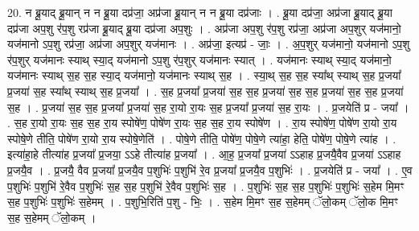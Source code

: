 \documentclass[17pt]{extarticle}
\begin{document}
20. न ब्रू॒याद् ब्रू॒यान् न न ब्रू॒या दप्र॑जा॒ अप्र॑जा ब्रू॒यान् न न ब्रू॒या दप्र॑जाः । . ब्रू॒या दप्र॑जा॒ अप्र॑जा ब्रू॒याद् ब्रू॒या दप्र॑जा अप॒शु र॑प॒शु रप्र॑जा ब्रू॒याद् ब्रू॒या दप्र॑जा अप॒शुः । . अप्र॑जा अप॒शु र॑प॒शु रप्र॑जा॒ अप्र॑जा अप॒शुर् यज॑मानो॒ यज॑मानो ऽप॒शु रप्र॑जा॒ अप्र॑जा अप॒शुर् यज॑मानः । . अप्र॑जा॒ इत्यप्र॑ - जाः॒ । . अ॒प॒शुर् यज॑मानो॒ यज॑मानो ऽप॒शु र॑प॒शुर् यज॑मानः स्याथ् स्या॒द् यज॑मानो ऽप॒शु र॑प॒शुर् यज॑मानः स्यात् । . यज॑मानः स्याथ् स्या॒द् यज॑मानो॒ यज॑मानः स्याथ् स॒ह स॒ह स्या॒द् यज॑मानो॒ यज॑मानः स्याथ् स॒ह । . स्या॒थ् स॒ह स॒ह स्या᳚थ् स्याथ् स॒ह प्र॒जया᳚ प्र॒जया॑ स॒ह स्या᳚थ् स्याथ् स॒ह प्र॒जया᳚ । . स॒ह प्र॒जया᳚ प्र॒जया॑ स॒ह स॒ह प्र॒जया॑ स॒ह स॒ह प्र॒जया॑ स॒ह स॒ह प्र॒जया॑ स॒ह । . प्र॒जया॑ स॒ह स॒ह प्र॒जया᳚ प्र॒जया॑ स॒ह रा॒यो रा॒यः स॒ह प्र॒जया᳚ प्र॒जया॑ स॒ह रा॒यः । . प्र॒जयेति॑ प्र - जया᳚ । . स॒ह रा॒यो रा॒यः स॒ह स॒ह रा॒य स्पोषे॑ण॒ पोषे॑ण रा॒यः स॒ह स॒ह रा॒य स्पोषे॑ण । . रा॒य स्पोषे॑ण॒ पोषे॑ण रा॒यो रा॒य स्पोषे॒णे तीति॒ पोषे॑ण रा॒यो रा॒य स्पोषे॒णेति॑ । . पोषे॒णे तीति॒ पोषे॑ण॒ पोषे॒णे त्या॑हा॒ हेति॒ पोषे॑ण॒ पोषे॒णे त्या॑ह । . इत्या॑हा॒हे तीत्या॑ह प्र॒जया᳚ प्र॒जया॒ ऽऽहे तीत्या॑ह प्र॒जया᳚ । . आ॒ह॒ प्र॒जया᳚ प्र॒जया॑ ऽऽहाह प्र॒जयै॒वैव प्र॒जया॑ ऽऽहाह प्र॒जयै॒व । . प्र॒जयै॒ वैव प्र॒जया᳚ प्र॒जयै॒व प॒शुभिः॑ प॒शुभि॑ रे॒व प्र॒जया᳚ प्र॒जयै॒व प॒शुभिः॑ । . प्र॒जयेति॑ प्र - जया᳚ । . ए॒व प॒शुभिः॑ प॒शुभि॑ रे॒वैव प॒शुभिः॑ स॒ह स॒ह प॒शुभि॑ रे॒वैव प॒शुभिः॑ स॒ह । . प॒शुभिः॑ स॒ह स॒ह प॒शुभिः॑ प॒शुभिः॑ स॒हेम मि॒मꣳ स॒ह प॒शुभिः॑ प॒शुभिः॑ स॒हेमम् । . प॒शुभि॒रिति॑ प॒शु - भिः॒ । . स॒हेम मि॒मꣳ स॒ह स॒हेमम् ॅलो॒कम् ॅलो॒क मि॒मꣳ स॒ह स॒हेमम् ॅलो॒कम् । \newline
\end{document}
